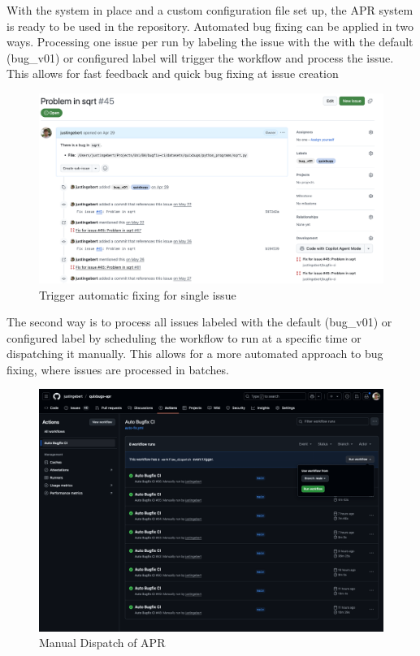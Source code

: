 With the system in place and a custom configuration file set up, the APR system is ready to be used in the repository. Automated bug fixing can be applied in two ways.
Processing one issue per run by labeling the issue with the with the default (bug\_v01) or configured label will trigger the workflow and process the issue. This allows for fast feedback and quick bug fixing at issue creation
\begin{figure}[H]
    \centering
    \includegraphics[width=1\textwidth]{images/github/GitHub Issue.png}
    \caption{Trigger automatic fixing for single issue}
    \label{fig:issue-trigger}
\end{figure}

The second way is to process all issues labeled with the default (bug\_v01) or configured label by scheduling the workflow to run at a specific time or dispatching it manually. This allows for a more automated approach to bug fixing, where issues are processed in batches.
\begin{figure}[H]
    \centering
    \includegraphics[width=1\textwidth]{images/workflow/dispatch.png}
    \caption{Manual Dispatch of APR}
    \label{fig:dispatch}
\end{figure}

